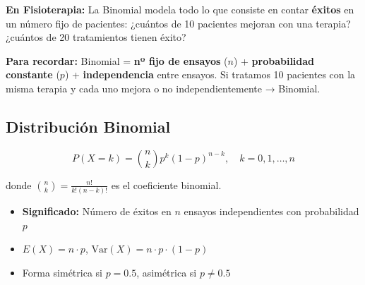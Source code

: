\documentclass[
  letterpaper,
  DIV=11,
  numbers=noendperiod]{scrartcl}
\providecommand{\tightlist}{%
  \setlength{\itemsep}{0pt}\setlength{\parskip}{0pt}}
\begin{document}
\textbf{En Fisioterapia:} La Binomial modela todo lo que consiste en
contar \textbf{éxitos} en un número fijo de pacientes: ¿cuántos de 10
pacientes mejoran con una terapia? ¿cuántos de 20 tratamientos tienen
éxito?

\begin{tcolorbox}[enhanced jigsaw, arc=.35mm, bottomrule=.15mm, bottomtitle=1mm, breakable, colback=white, colbacktitle=quarto-callout-tip-color!10!white, colframe=quarto-callout-tip-color-frame, coltitle=black, left=2mm, leftrule=.75mm, opacityback=0, opacitybacktitle=0.6, rightrule=.15mm, title=\textcolor{quarto-callout-tip-color}{\faLightbulb}\hspace{0.5em}{Tip}, titlerule=0mm, toprule=.15mm, toptitle=1mm]

\textbf{Para recordar:} Binomial = \textbf{nº fijo de ensayos} (\(n\)) +
\textbf{probabilidad constante} (\(p\)) + \textbf{independencia} entre
ensayos. Si tratamos 10 pacientes con la misma terapia y cada uno mejora
o no independientemente → Binomial.

\end{tcolorbox}

\subsection{Distribución Binomial}\label{distribucion-binomial}

\begin{tcolorbox}[enhanced jigsaw, arc=.35mm, bottomrule=.15mm, bottomtitle=1mm, breakable, colback=white, colbacktitle=quarto-callout-note-color!10!white, colframe=quarto-callout-note-color-frame, coltitle=black, left=2mm, leftrule=.75mm, opacityback=0, opacitybacktitle=0.6, rightrule=.15mm, title=\textcolor{quarto-callout-note-color}{\faInfo}\hspace{0.5em}{Note}, titlerule=0mm, toprule=.15mm, toptitle=1mm]

\[P(X = k) = \binom{n}{k} p^k (1-p)^{n-k}, \quad k = 0,1,\ldots,n\]

donde \(\binom{n}{k} = \frac{n!}{k!(n-k)!}\) es el coeficiente binomial.

\end{tcolorbox}

\begin{itemize}
\tightlist
\item
  \textbf{Significado:} Número de éxitos en \(n\) ensayos independientes
  con probabilidad \(p\)
\item
  \(E(X) = n \cdot p\), \(\text{Var}(X) = n \cdot p \cdot (1-p)\)
\item
  Forma simétrica si \(p = 0.5\), asimétrica si \(p \neq 0.5\)
\end{itemize}
\end{document}
